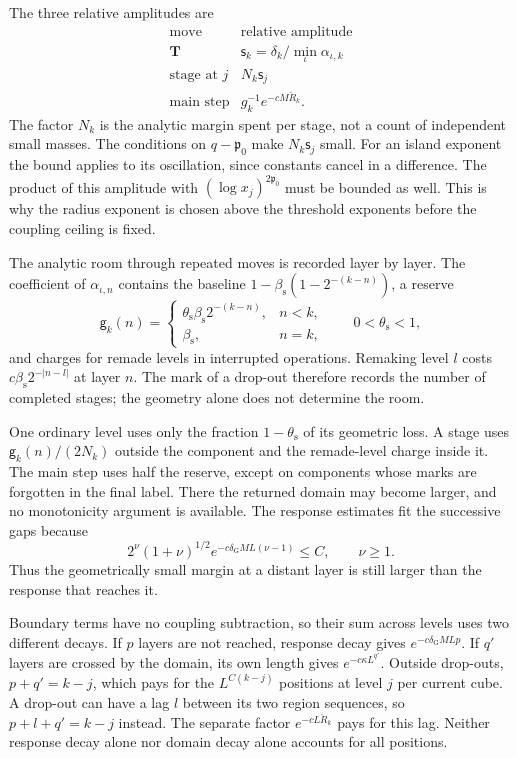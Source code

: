 \documentclass[11pt,letterpaper,reqno]{amsart}
\theoremstyle{definition}
\theoremstyle{remark}
\begin{document}
The three relative amplitudes are
\begin{equation}\label{eq:xrg-history-amplitudes}
 \begin{array}{c|c}
 \text{move}&\text{relative amplitude}\\ \hline
 \mathbf T&\mathsf s_k=\delta_k/\min_\iota\alpha_{\iota,k}\\
 \text{stage at }j&N_k\mathsf s_j\\
 \text{main step}&g_k^{-1}e^{-cM\check R_k}.
 \end{array}
\end{equation}
The factor $N_k$ is the analytic
margin spent per stage, not a count
of independent small masses. The
conditions on $q-\mathfrak p_0$
make $N_k\mathsf s_j$ small.
For an island exponent the bound
applies to its oscillation, since
constants cancel in a difference.
The product of this amplitude with
$(\log x_j)^{2\mathfrak p_0}$ must
be bounded as well. This is why
the radius exponent is chosen above
the threshold exponents before the
coupling ceiling is fixed.

The analytic room through repeated
moves is recorded layer by layer.
The coefficient of $\alpha_{\iota,n}$
contains the baseline
$1-\beta_{\mathrm s}(1-2^{-(k-n)})$,
a reserve
\[
 \mathsf g_k(n)=
 \begin{cases}
 \theta_{\mathrm s}\beta_{\mathrm s}2^{-(k-n)},&n<k,\\
 \beta_{\mathrm s},&n=k,
 \end{cases}
 \qquad 0<\theta_{\mathrm s}<1,
\]
and charges for remade levels in
interrupted operations. Remaking
level $l$ costs
$c\beta_{\mathrm s}2^{-|n-l|}$ at
layer $n$. The mark of a drop-out
therefore records the number of
completed stages; the geometry
alone does not determine the room.

One ordinary level uses only the
fraction $1-\theta_{\mathrm s}$
of its geometric loss. A stage
uses $\mathsf g_k(n)/(2N_k)$
outside the component and the
remade-level charge inside it.
The main step uses half the
reserve, except on components
whose marks are forgotten in
the final label. There the
returned domain may become
larger, and no monotonicity
argument is available.
The response estimates fit the
successive gaps because
\[
 2^\nu(1+\nu)^{1/2}
       e^{-c\delta_{\mathrm G}ML(\nu-1)}\le C,
                     \qquad \nu\ge1.
\]
Thus the geometrically small
margin at a distant layer is
still larger than the response
that reaches it.

Boundary terms have no coupling
subtraction, so their sum across
levels uses two different decays.
If $p$ layers are not reached,
response decay gives
$e^{-c\delta_{\mathrm G}MLp}$.
If $q'$ layers are crossed by
the domain, its own length gives
$e^{-c\kappa L^{q'}}$.
Outside drop-outs, $p+q'=k-j$,
which pays for the
$L^{C(k-j)}$ positions at level
$j$ per current cube. A
drop-out can have a lag $l$
between its two region sequences,
so $p+l+q'=k-j$ instead.
The separate factor
$e^{-cL\check R_k}$ pays for
this lag. Neither response
decay alone nor domain decay
alone accounts for all positions.
\end{document}
